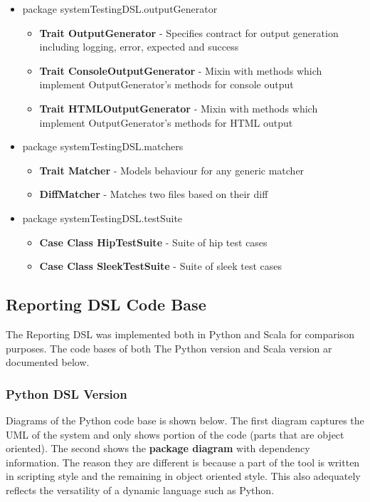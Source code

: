 \begin{itemize}
\begin{itemize}
    \end{itemize}
\item package systemTestingDSL.outputGenerator
    \begin{itemize}
        \item \textbf{Trait OutputGenerator} - Specifies contract for output generation including logging, error, expected and success
        \item \textbf{Trait ConsoleOutputGenerator} - Mixin with methods which implement OutputGenerator's methods for console output
        \item \textbf{Trait HTMLOutputGenerator} - Mixin with methods which implement OutputGenerator's methods for HTML output
    \end{itemize}
\item package systemTestingDSL.matchers
    \begin{itemize}
    \item \textbf{Trait Matcher} - Models behaviour for any generic matcher
    \item \textbf{DiffMatcher} - Matches two files based on their diff
    \end{itemize}
\item package systemTestingDSL.testSuite
    \begin{itemize}
    \item \textbf{Case Class HipTestSuite} - Suite of hip test cases
    \item \textbf{Case Class SleekTestSuite} - Suite of sleek test cases
    \end{itemize}
\end{itemize}

\subsection{Reporting DSL Code Base}
The Reporting DSL was implemented both in Python and Scala for comparison purposes. The code bases of both The Python version and Scala version ar documented below.

\subsubsection{Python DSL Version}
Diagrams of the Python code base is shown below. The first diagram captures the UML of the system and only shows portion of the code (parts that are object oriented). The second shows the \textbf{package diagram} with dependency information. The reason they are different is because a part of the tool is written in scripting style and the remaining in object oriented style. This also adequately reflects the versatility of a dynamic language such as Python.

